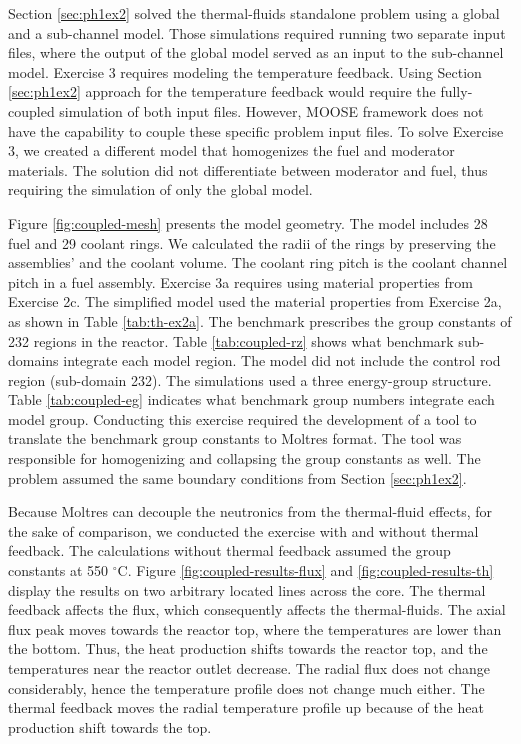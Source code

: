 Section \ref{sec:ph1ex2} solved the thermal-fluids standalone problem using a global and a sub-channel model.
Those simulations required running two separate input files, where the output of the global model served as an input to the sub-channel model.
Exercise 3 requires modeling the temperature feedback.
Using Section \ref{sec:ph1ex2} approach for the temperature feedback would require the fully-coupled simulation of both input files.
However, MOOSE framework does not have the capability to couple these specific problem input files.
To solve Exercise 3, we created a different model that homogenizes the fuel and moderator materials.
The solution did not differentiate between moderator and fuel, thus requiring the simulation of only the global model.

Figure \ref{fig:coupled-mesh} presents the model geometry.
The model includes 28 fuel and 29 coolant rings.
We calculated the radii of the rings by preserving the assemblies' and the coolant volume.
The coolant ring pitch is the coolant channel pitch in a fuel assembly.
Exercise 3a requires using material properties from Exercise 2c.
The simplified model used the material properties from Exercise 2a, as shown in Table \ref{tab:th-ex2a}.
The benchmark prescribes the group constants of 232 regions in the reactor.
Table \ref{tab:coupled-rz} shows what benchmark sub-domains integrate each model region.
The model did not include the control rod region (sub-domain 232).
The simulations used a three energy-group structure.
Table \ref{tab:coupled-eg} indicates what benchmark group numbers integrate each model group.
Conducting this exercise required the development of a tool to translate the benchmark group constants to Moltres format.
The tool was responsible for homogenizing and collapsing the group constants as well.
The problem assumed the same boundary conditions from Section \ref{sec:ph1ex2}.

Because Moltres can decouple the neutronics from the thermal-fluid effects, for the sake of comparison, we conducted the exercise with and without thermal feedback.
The calculations without thermal feedback assumed the group constants at 550 $^{\circ}$C.
Figure \ref{fig:coupled-results-flux} and \ref{fig:coupled-results-th} display the results on two arbitrary located lines across the core.
The thermal feedback affects the flux, which consequently affects the thermal-fluids.
The axial flux peak moves towards the reactor top, where the temperatures are lower than the bottom.
Thus, the heat production shifts towards the reactor top, and the temperatures near the reactor outlet decrease.
The radial flux does not change considerably, hence the temperature profile does not change much either.
The thermal feedback moves the radial temperature profile up because of the heat production shift towards the top.


